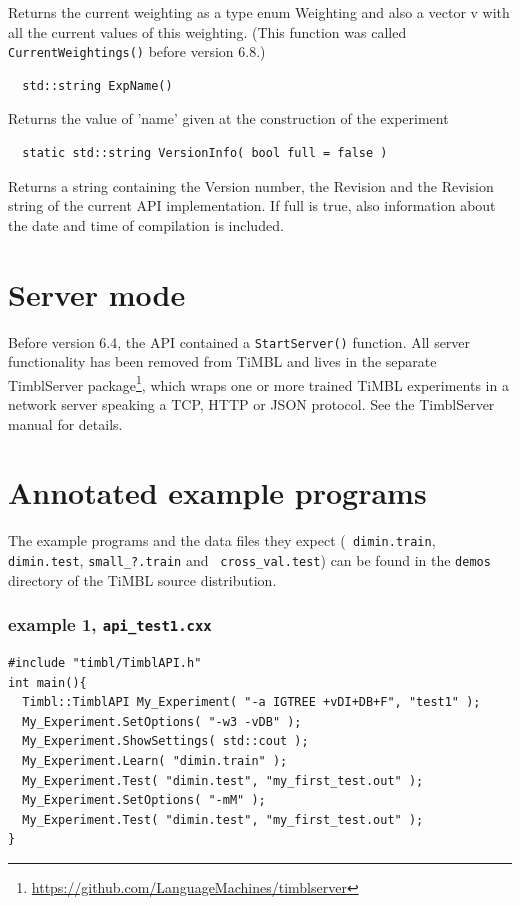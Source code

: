 \documentclass{report}
\begin{document}
Returns the current weighting as a type enum Weighting and also a
vector v with all the current values of this weighting. (This
function was called {\tt CurrentWeightings()} before version 6.8.)

\begin{footnotesize}
\begin{verbatim}
  std::string ExpName()
\end{verbatim}
\end{footnotesize}

Returns the value of 'name' given at the construction of the experiment

\begin{footnotesize}
\begin{verbatim}
  static std::string VersionInfo( bool full = false )
\end{verbatim}
\end{footnotesize}

Returns a string containing the Version number, the Revision and the
Revision string of the current API implementation. If full is true,
also information about the date and time of compilation is included.

\chapter{Server mode}
\label{server}

Before version 6.4, the API contained a {\tt StartServer()}
function. All server functionality has been removed from TiMBL and
lives in the separate TimblServer
package\footnote{\url{https://github.com/LanguageMachines/timblserver}},
which wraps one or more trained TiMBL experiments in a network server
speaking a TCP, HTTP or JSON protocol. See the TimblServer manual for
details.

\clearpage
\chapter{Annotated example programs}

The example programs and the data files they expect ({\tt
  dimin.train}, {\tt dimin.test}, {\tt small\_?.train} and {\tt
  cross\_val.test}) can be found in the {\tt demos} directory of the
TiMBL source distribution.

\subsection{example 1, {\tt api\_test1.cxx}}
\begin{footnotesize}
\begin{verbatim}
#include "timbl/TimblAPI.h"
int main(){
  Timbl::TimblAPI My_Experiment( "-a IGTREE +vDI+DB+F", "test1" );
  My_Experiment.SetOptions( "-w3 -vDB" );
  My_Experiment.ShowSettings( std::cout );
  My_Experiment.Learn( "dimin.train" );
  My_Experiment.Test( "dimin.test", "my_first_test.out" );
  My_Experiment.SetOptions( "-mM" );
  My_Experiment.Test( "dimin.test", "my_first_test.out" );
}
\end{verbatim}
\end{footnotesize}
\end{document}
